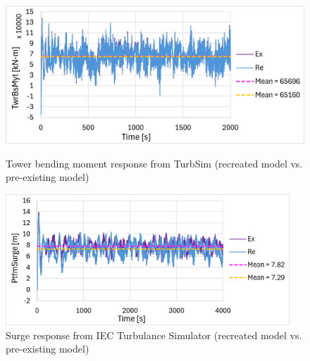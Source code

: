 \documentclass[a4paper, 11pt]{article}
\begin{document}
\begin{figure}[H]
    \begin{minipage}{0.48\textwidth}
        \centering
        \includegraphics[width=1\textwidth]{3.2_turb_twr_mine.png}
        \caption{\small Tower bending moment response from TurbSim (recreated model vs. pre-existing model)}
        \label{fig:3.2_turb_twr_mine_recreated}
    \end{minipage}
    \hfill
    \begin{minipage}{0.5\textwidth}
        \centering
        \includegraphics[width=0.95\textwidth]{3.2_iec_surge_mine.png}
        \caption{\small Surge response from IEC Turbulance Simulator (recreated model vs. pre-existing model)}
        \label{fig:3.2_iec_surge_mine_recreated}
    \end{minipage}
\end{figure}
\end{document}
